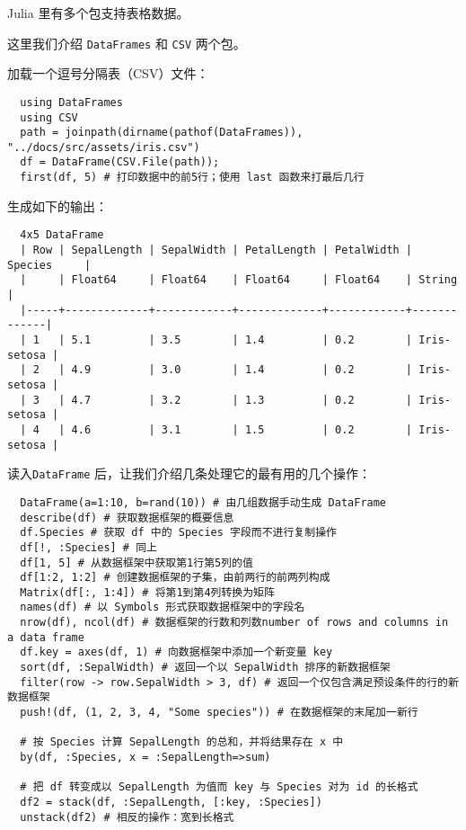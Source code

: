 \documentclass[10pt,a4paper]{article}
\begin{document}
Julia 里有多个包支持表格数据。

这里我们介绍 \lstinline|DataFrames| 和 \lstinline|CSV| 两个包。

加载一个逗号分隔表（CSV）文件：
\begin{lstlisting}
  using DataFrames
  using CSV
  path = joinpath(dirname(pathof(DataFrames)), "../docs/src/assets/iris.csv")
  df = DataFrame(CSV.File(path));
  first(df, 5) # 打印数据中的前5行；使用 last 函数来打最后几行
\end{lstlisting}

生成如下的输出：
\begin{lstlisting}
  4x5 DataFrame
  | Row | SepalLength | SepalWidth | PetalLength | PetalWidth | Species     |
  |     | Float64     | Float64    | Float64     | Float64    | String      |
  |-----+-------------+------------+-------------+------------+-------------|
  | 1   | 5.1         | 3.5        | 1.4         | 0.2        | Iris-setosa |
  | 2   | 4.9         | 3.0        | 1.4         | 0.2        | Iris-setosa |
  | 3   | 4.7         | 3.2        | 1.3         | 0.2        | Iris-setosa |
  | 4   | 4.6         | 3.1        | 1.5         | 0.2        | Iris-setosa |
\end{lstlisting}

读入\lstinline|DataFrame| 后，让我们介绍几条处理它的最有用的几个操作：
\begin{lstlisting}
  DataFrame(a=1:10, b=rand(10)) # 由几组数据手动生成 DataFrame
  describe(df) # 获取数据框架的概要信息
  df.Species # 获取 df 中的 Species 字段而不进行复制操作
  df[!, :Species] # 同上
  df[1, 5] # 从数据框架中获取第1行第5列的值
  df[1:2, 1:2] # 创建数据框架的子集，由前两行的前两列构成
  Matrix(df[:, 1:4]) # 将第1到第4列转换为矩阵
  names(df) # 以 Symbols 形式获取数据框架中的字段名
  nrow(df), ncol(df) # 数据框架的行数和列数number of rows and columns in a data frame
  df.key = axes(df, 1) # 向数据框架中添加一个新变量 key
  sort(df, :SepalWidth) # 返回一个以 SepalWidth 排序的新数据框架
  filter(row -> row.SepalWidth > 3, df) # 返回一个仅包含满足预设条件的行的新数据框架
  push!(df, (1, 2, 3, 4, "Some species")) # 在数据框架的末尾加一新行

  # 按 Species 计算 SepalLength 的总和，并将结果存在 x 中
  by(df, :Species, x = :SepalLength=>sum)

  # 把 df 转变成以 SepalLength 为值而 key 与 Species 对为 id 的长格式
  df2 = stack(df, :SepalLength, [:key, :Species])
  unstack(df2) # 相反的操作：宽到长格式
\end{lstlisting}
\end{document}
